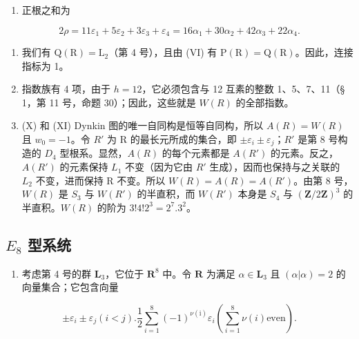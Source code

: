 \begin{enumerate}
\def\labelenumi{(\Roman{enumi})}
\setcounter{enumi}{6}
\tightlist
\item
  正根之和为
\end{enumerate}

\[
2 \rho = 11 \varepsilon_ {1} + 5 \varepsilon_ {2} + 3 \varepsilon_ {3} + \varepsilon_ {4} = 16 \alpha_ {1} + 30 \alpha_ {2} + 42 \alpha_ {3} + 22 \alpha_ {4}.
\]

\begin{enumerate}
\def\labelenumi{(\Roman{enumi})}
\setcounter{enumi}{7}
\item
  我们有 \(\mathrm{Q}(\mathrm{R}) = \mathrm{L}_2\)（第 4 号），且由 (VI) 有 \(\mathrm{P}(\mathrm{R}) = \mathrm{Q}(\mathrm{R})\)。因此，连接指标为 1。
\item
  指数族有 4 项，由于 \(h = 12\)，它必须包含与 12 互素的整数 1、5、7、11（§ 1，第 11 号，命题 30）；因此，这些就是 \(W(R)\) 的全部指数。
\item
  (X) 和 (XI) Dynkin 图的唯一自同构是恒等自同构，所以 \(A(R) = W(R)\) 且 \(w_{0} = -1\)。令 \(R'\) 为 R 的最长元所成的集合，即 \(\pm\varepsilon_{i} \pm \varepsilon_{j}\)；\(R'\) 是第 8 号构造的 \(D_{4}\) 型根系。显然，\(A(R)\) 的每个元素都是 \(A(R')\) 的元素。反之，\(A(R')\) 的元素保持 \(L_{1}\) 不变（因为它由 \(R'\) 生成），因而也保持与之关联的 \(L_{2}\) 不变，进而保持 R 不变。所以 \(W(R) = A(R) = A(R')\)。由第 8 号，\(W(R)\) 是 \(S_{3}\) 与 \(W(R')\) 的半直积，而 \(W(R')\) 本身是 \(S_{4}\) 与 \((\mathbf{Z}/2\mathbf{Z})^{3}\) 的半直积。\(W(R)\) 的阶为 \(3!4!2^{3} = 2^{7}.3^{2}\)。
\end{enumerate}

\subsection{\texorpdfstring{\(E_{8}\) 型系统}{E\_8 型系统}}

\begin{enumerate}
\def\labelenumi{(\Roman{enumi})}
\tightlist
\item
  考虑第 4 号的群 \(\mathbf{L}_3\)，它位于 \(\mathbf{R}^8\) 中。令 \(\mathbf{R}\) 为满足 \(\alpha \in \mathbf{L}_3\) 且 \((\alpha |\alpha) = 2\) 的向量集合；它包含向量
\end{enumerate}

\[
\pm \varepsilon_ {i} \pm \varepsilon_ {j} (i <   j). \frac {1}{2} \sum_ {i = 1} ^ {8} (- 1) ^ {\nu (\mathrm{i})} \varepsilon_ {i} \left(\sum_ {i = 1} ^ {8} \nu (i) \text {even}\right).
\]

